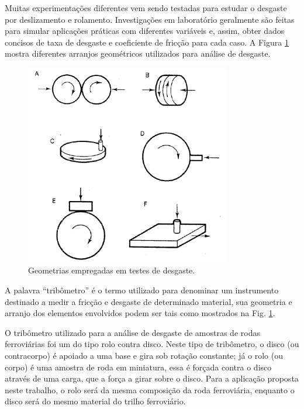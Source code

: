 \documentclass[
12pt,
openany, %
oneside, %
a4paper,			
english,			
brazil			        %
]{abntbibufjf}
\begin{document}
	Muitas experimentações diferentes vem sendo testadas para estudar o desgaste por deslizamento e rolamento. Investigações em laboratório geralmente são feitas para simular aplicações práticas com diferentes variáveis e, assim, obter dados concisos de taxa de desgaste e coeficiente de fricção para cada caso. A Figura \ref{fig:testes_desgaste} mostra diferentes arranjos geométricos utilizados para análise de desgaste. 
	
	\begin{figure}[H]
		\centering
		\includegraphics[width=0.8\textwidth]{testes_desgaste}
		\caption{Geometrias empregadas em testes de desgaste. \cite{hutchings1992tribology}}
		\label{fig:testes_desgaste}
	\end{figure}

	A palavra ``tribômetro'' é o termo utilizado para denominar um instrumento destinado a medir a fricção e desgaste de determinado material, sua geometria e arranjo dos elementos envolvidos podem ser tais como mostrados na Fig. \ref{fig:testes_desgaste}. 
	
	O tribômetro utilizado para a análise de desgaste de amostras de rodas ferroviárias foi um do tipo rolo contra disco. Neste tipo de tribômetro, o disco (ou contracorpo) é apoiado a uma base e gira sob rotação constante; já o rolo (ou corpo) é uma amostra de roda em miniatura, essa é forçada contra o disco através de uma carga, que a força a girar sobre o disco. Para a aplicação proposta neste trabalho, o rolo será da mesma composição da roda ferroviária, enquanto o disco será do mesmo material do trilho ferroviário. 
	
\end{document}
